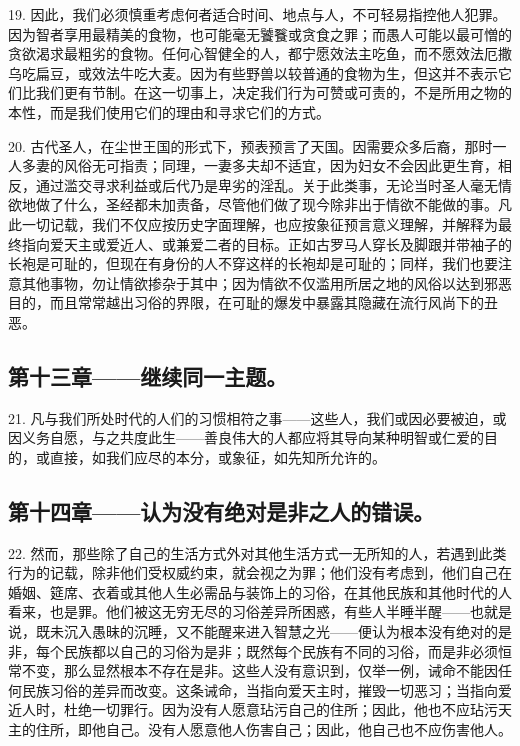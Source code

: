 19. 因此，我们必须慎重考虑何者适合时间、地点与人，不可轻易指控他人犯罪。因为智者享用最精美的食物，也可能毫无饕餮或贪食之罪；而愚人可能以最可憎的贪欲渴求最粗劣的食物。任何心智健全的人，都宁愿效法主吃鱼，而不愿效法厄撒乌吃扁豆，或效法牛吃大麦。因为有些野兽以较普通的食物为生，但这并不表示它们比我们更有节制。在这一切事上，决定我们行为可赞或可责的，不是所用之物的本性，而是我们使用它们的理由和寻求它们的方式。\par

20. 古代圣人，在尘世王国的形式下，预表预言了天国。因需要众多后裔，那时一人多妻的风俗无可指责；同理，一妻多夫却不适宜，因为妇女不会因此更生育，相反，通过滥交寻求利益或后代乃是卑劣的淫乱。关于此类事，无论当时圣人毫无情欲地做了什么，圣经都未加责备，尽管他们做了现今除非出于情欲不能做的事。凡此一切记载，我们不仅应按历史字面理解，也应按象征预言意义理解，并解释为最终指向爱天主或爱近人、或兼爱二者的目标。正如古罗马人穿长及脚跟并带袖子的长袍是可耻的，但现在有身份的人不穿这样的长袍却是可耻的；同样，我们也要注意其他事物，勿让情欲掺杂于其中；因为情欲不仅滥用所居之地的风俗以达到邪恶目的，而且常常越出习俗的界限，在可耻的爆发中暴露其隐藏在流行风尚下的丑恶。\par


\subsection{第十三章——继续同一主题。}

21. 凡与我们所处时代的人们的习惯相符之事——这些人，我们或因必要被迫，或因义务自愿，与之共度此生——善良伟大的人都应将其导向某种明智或仁爱的目的，或直接，如我们应尽的本分，或象征，如先知所允许的。\par


\subsection{第十四章——认为没有绝对是非之人的错误。}

22. 然而，那些除了自己的生活方式外对其他生活方式一无所知的人，若遇到此类行为的记载，除非他们受权威约束，就会视之为罪；他们没有考虑到，他们自己在婚姻、筵席、衣着或其他人生必需品与装饰上的习俗，在其他民族和其他时代的人看来，也是罪。他们被这无穷无尽的习俗差异所困惑，有些人半睡半醒——也就是说，既未沉入愚昧的沉睡，又不能醒来进入智慧之光——便认为根本没有绝对的是非，每个民族都以自己的习俗为是非；既然每个民族有不同的习俗，而是非必须恒常不变，那么显然根本不存在是非。这些人没有意识到，仅举一例，诫命不能因任何民族习俗的差异而改变。这条诫命，当指向爱天主时，摧毁一切恶习；当指向爱近人时，杜绝一切罪行。因为没有人愿意玷污自己的住所；因此，他也不应玷污天主的住所，即他自己。没有人愿意他人伤害自己；因此，他自己也不应伤害他人。\par

